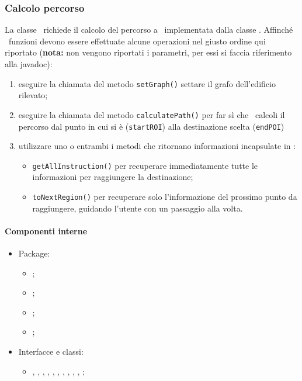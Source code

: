\documentclass[../Funzionalita.tex]{subfiles}
\begin{document}
		\subsubsection{Calcolo percorso}
			La classe \NavigationManagerImp\ richiede il calcolo del percorso a \Navigator\ implementata dalla classe \NavigatorImp. Affinché \NavigatorImp\ funzioni devono essere effettuate alcune operazioni nel giusto ordine qui riportato (\textbf{nota:} non vengono riportati i parametri, per essi si faccia riferimento alla javadoc):
			\begin{enumerate}
				\item eseguire la chiamata del metodo \lstinline|setGraph()| settare il grafo dell'edificio rilevato;
				\item eseguire la chiamata del metodo \lstinline|calculatePath()| per far sì che \NavigatorImp\ calcoli il percorso dal punto in cui si è (\lstinline|startROI|) alla destinazione scelta (\lstinline|endPOI|)
				\item utilizzare uno o entrambi i metodi che ritornano informazioni incapsulate in \ProcessedInformation:
				\begin{itemize}
					\item \lstinline|getAllInstruction()| per recuperare immediatamente tutte le informazioni per raggiungere la destinazione;
					\item \lstinline|toNextRegion()| per recuperare solo l'informazione del prossimo punto da raggiungere, guidando l'utente con un passaggio alla volta.
				\end{itemize}
			\end{enumerate}
		
			\paragraph*{Componenti interne}
			\begin{itemize}
			
				\item Package:
				\begin{itemize}
					\item[] \navigator;
					\item[] \algorithm;
					\item[] \graph;
					\item[] \area;
				\end{itemize}
				
				\item Interfacce e classi:
				\begin{itemize}
					\item[] \Navigator, \NavigatorImp, \ProcessedInformation, \ProcessedInformationImp, \PathFinder, \DijkstraPathFinder, \Compass, \MapGraph, \EnrichedEdge, \PointOfInterest, \RegionOfInterest;
				\end{itemize}
				
			\end{itemize}
			
\end{document}
